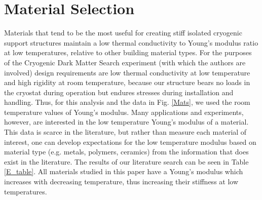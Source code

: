 \documentclass[final]{svjour2}
\begin{document}
\section{Material Selection}

Materials that tend to be the most useful for creating stiff isolated cryogenic support structures maintain a low thermal conductivity to Young's modulus ratio at low temperatures, relative to other building material types. For the purposes of the Cryogenic Dark Matter Search experiment (with which the authors are involved) design requirements are low thermal conductivity at low temperature and high rigidity at room temperature, because our structure bears no loads in the cryostat during operation but endures stresses during installation and handling. Thus, for this analysis and the data in Fig. \ref{Mats}, we used the room temperature values of Young’s modulus. Many applications and experiments, however, are interested in the low temperature Young's modulus of a material. This data is scarce in the literature, but rather than measure each material of interest, one can develop expectations for the low temperature modulus based on material type (e.g. metals, polymers, ceramics) from the information that does exist in the literature. The results of our literature search can be seen in Table \ref{E_table}. All materials studied in this paper have a Young's modulus which increases with decreasing temperature, thus increasing their stiffness at low temperatures.
\end{document}
